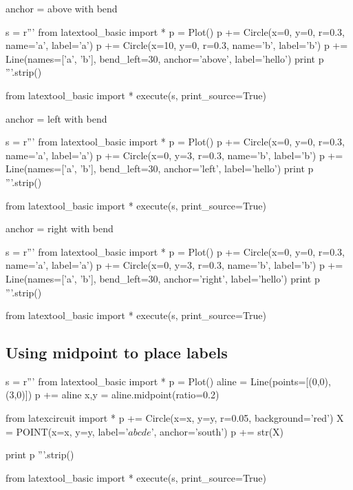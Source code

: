 anchor = above with bend
\begin{python}
s = r'''
from latextool_basic import *
p = Plot()
p += Circle(x=0, y=0, r=0.3, name='a', label='a')
p += Circle(x=10, y=0, r=0.3, name='b', label='b')
p += Line(names=['a', 'b'], bend_left=30, anchor='above', label='hello')
print p
'''.strip()

from latextool_basic import *
execute(s, print_source=True)
\end{python}



\newpage
anchor = left with bend
\begin{python}
s = r'''
from latextool_basic import *
p = Plot()
p += Circle(x=0, y=0, r=0.3, name='a', label='a')
p += Circle(x=0, y=3, r=0.3, name='b', label='b')
p += Line(names=['a', 'b'], bend_left=30, anchor='left', label='hello')
print p
'''.strip()

from latextool_basic import *
execute(s, print_source=True)
\end{python}

anchor = right with bend
\begin{python}
s = r'''
from latextool_basic import *
p = Plot()
p += Circle(x=0, y=0, r=0.3, name='a', label='a')
p += Circle(x=0, y=3, r=0.3, name='b', label='b')
p += Line(names=['a', 'b'], bend_left=30, anchor='right', label='hello')
print p
'''.strip()

from latextool_basic import *
execute(s, print_source=True)
\end{python}





\newpage
\subsection{Using midpoint to place labels}

\begin{python}
s = r'''
from latextool_basic import *
p = Plot()
aline = Line(points=[(0,0), (3,0)])
p += aline
x,y = aline.midpoint(ratio=0.2)

from latexcircuit import *
p += Circle(x=x, y=y, r=0.05, background='red')
X = POINT(x=x, y=y, label='$abcde$', anchor='south')
p += str(X)

print p
'''.strip()

from latextool_basic import *
execute(s, print_source=True)
\end{python}





